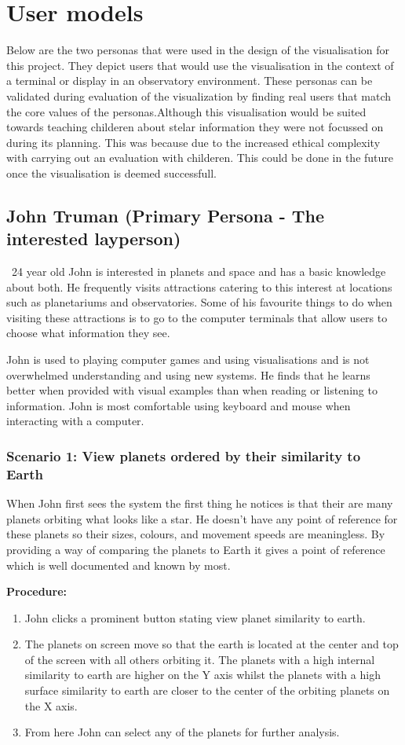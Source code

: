 \section{User models}
Below are the two personas that were used in the design of the visualisation for
this project. They depict users that would use the visualisation in the context
of a terminal or display in an observatory environment. These personas  can be
validated during evaluation of the visualization by finding real users that
match the core values of the personas.Although this visualisation would be suited towards teaching childeren about stelar information they were not focussed on during its planning. This was because due to the increased ethical complexity with carrying out an evaluation with childeren. This could be done in the future once the visualisation is deemed successfull. 

\subsection{John Truman (Primary Persona - The interested layperson)}\
24 year old John is interested in planets and space and has a basic knowledge
about both. He frequently visits attractions catering to this interest at
locations such as planetariums and observatories. Some of his favourite things
to do when visiting these attractions is to go to the computer terminals that
allow users to choose what information they see.

John is used to playing computer games and using visualisations and is not
overwhelmed understanding and using new systems. He finds that he learns better
when provided with visual examples than when reading or listening to
information. John is most comfortable using keyboard and mouse when interacting
with a computer.

\subsubsection{Scenario 1: View planets ordered by their similarity to Earth}
 When John first sees the system the first thing he notices is that their are
many planets orbiting what looks like a star. He doesn't have any point of
reference for these planets so their sizes, colours, and movement speeds are
meaningless. By providing a way of comparing the planets to Earth it gives a
point of reference which is well documented and known by most.
 
 {\bf Procedure:}
 \begin{enumerate}
 \item John clicks a prominent button stating view planet similarity to earth.
 \item The planets on screen move so that the earth is located at the center and
top of the screen with all others orbiting it. The planets with a high internal
similarity to earth are higher on the Y axis whilst the planets with a high
surface similarity to earth are closer to the center of the orbiting planets on
the X axis.
 \item From here John can select any of the planets for further analysis.
 \end{enumerate}


